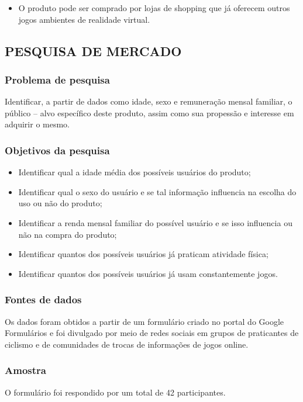 \begin{apendicesenv}
\begin{itemize}
\item
O produto pode ser comprado por lojas de shopping que já oferecem outros jogos ambientes de realidade virtual.
\end{itemize}

 
\subsection{PESQUISA DE MERCADO}
 
\subsubsection{Problema de pesquisa}

Identificar, a partir de dados como idade, sexo e remuneração mensal familiar, o público – alvo específico deste produto, assim como sua propessão e interesse em adquirir o mesmo.
 
\subsubsection{Objetivos da pesquisa}

\begin{itemize}
\item 
Identificar qual a idade média dos possíveis usuários do produto; 
\item
Identificar qual o sexo do usuário e se tal informação influencia na escolha do uso ou não do produto; 
\item
Identificar a renda mensal familiar do possível usuário e se isso influencia ou não na compra do produto; 
\item
Identificar quantos dos possíveis usuários já praticam atividade física; 

\item
Identificar quantos dos possíveis usuários já usam constantemente jogos.
\end{itemize}


\subsubsection{Fontes de dados}

Os dados foram obtidos a partir de um formulário criado no portal do Google Formulários e foi divulgado por meio de redes sociais em grupos de praticantes de ciclismo e de comunidades de trocas de informações de jogos online. 
 
\subsubsection{Amostra}
O formulário foi respondido por um total de 42 participantes. 
 

\end{apendicesenv}
